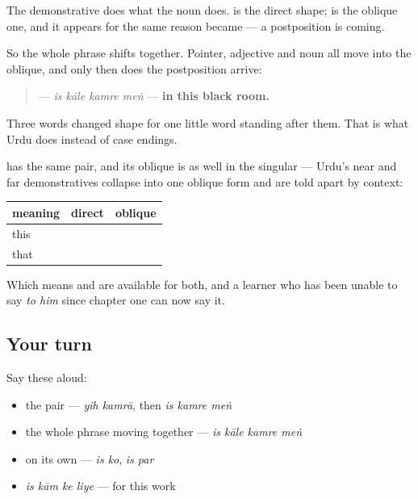 The demonstrative does what the noun does. \textbf{} is the direct shape; \textbf{} is the oblique one, and it appears for the same reason \textbf{} became \textbf{} — a postposition is coming.

So the whole phrase shifts together. Pointer, adjective and noun all move into the oblique, and only then does the postposition arrive:

\begin{quote}
\textbf{   } — \emph{is kāle kamre meṅ} — \textbf{in this black room.}
\end{quote}

Three words changed shape for one little word standing after them. That is what Urdu does instead of case endings.

\begin{grammarlens}[title={Grammar Lens: the far one too}]
\textbf{} has the same pair, and its oblique is \textbf{} as well in the singular — Urdu's near and far demonstratives collapse into one oblique form and are told apart by context:

\noindent
\begin{tabularx}{\linewidth}{@{}>{\raggedright\arraybackslash}X>{\raggedright\arraybackslash}X>{\raggedright\arraybackslash}X@{}}
\toprule
\textbf{meaning} & \textbf{direct} & \textbf{oblique} \\
\midrule
this & \textbf{\ur{یہ}} & \textbf{\ur{اس}} \\
that & \textbf{\ur{وہ}} & \textbf{\ur{اس}} \\
\bottomrule
\end{tabularx}

Which means \textbf{ } and \textbf{ } are available for both, and a learner who has been unable to say \emph{to him} since chapter one can now say it.
\end{grammarlens}

\subsection*{Your turn}
Say these aloud:

\begin{itemize}
\raggedright
  \item the pair — \emph{yih kamrā}, then \emph{is kamre meṅ}
  \item the whole phrase moving together — \emph{is kāle kamre meṅ}
  \item on its own — \emph{is ko}, \emph{is par}
  \item \emph{is kām ke liye} — for this work
\end{itemize}


